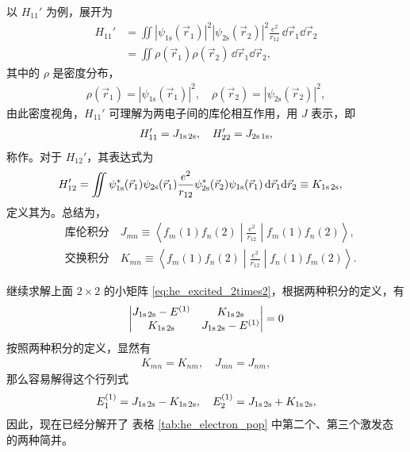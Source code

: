 以 $H_{11}'$ 为例，展开为
\begin{align}
    H_{11}' &= \iint |\psi_{\text{1s}}(\vec r_1)|^2 |\psi_{\text{2s}}(\vec r_2)|^2 \frac{e^2}{r_{12}} \,\dd\vec r_1 \dd\vec r_2 \\
    & = \iint \rho(\vec r_1) \rho(\vec r_2) \,\dd\vec r_1 \dd\vec r_2,
\end{align}
其中的 $\rho$ 是密度分布，
\begin{align}
    \rho(\vec r_1) = |\psi_{\text{1s}}(\vec r_1)|^2,
    \quad 
    \rho(\vec r_2) = |\psi_{\text{2s}}(\vec r_2)|^2,
\end{align}
由此密度视角，$H_{11}'$ 可理解为两电子间的库伦相互作用，用 $J$ 表示，即
\begin{align}
    H'_{11} = J_{\text{1s\,2s}}, \quad H_{22}' = J_{\text{2s\,1s}},
\end{align}
称作。对于 $H_{12}'$，其表达式为
\begin{align}
H_{12}' &= \iint \psi_{\text{1s}}^*(\vec r_1) \psi_{\text{2s}} (\vec r_1) \frac{e^2}{r_{12}} \psi_{\text{2s}}^*(\vec r_2) \psi_{\text{1s}} (\vec r_1) \,\mathrm{d}\vec r_1 \mathrm{d}\vec r_2 \equiv K_{\text{1s\,2s}},
\end{align}
定义其为。总结为，
\begin{align}
&\text{库伦积分}\quad 
J_{mn} \equiv \left\langle f_m(1) f_n(2) \middle| \frac{e^2}{r_{12}} \middle| f_m(1)f_n(2) \right\rangle, \\
&\text{交换积分}\quad K_{mn} \equiv \left\langle f_m(1) f_n(2) \middle| \frac{e^2}{r_{12}} \middle| f_n(1)f_m(2) \right\rangle. 
\end{align}

继续求解上面 $2\times2$ 的小矩阵 \eqref{eq:he_excited_2times2}，根据两种积分的定义，有
\begin{align}
    \left|\begin{matrix}
        J_{\text{1s\,2s}} - E^{(1)} & K_{\text{1s\,2s}} \\
        K_{\text{1s\,2s}} & J_{\text{1s\,2s}} - E^{(1)}
    \end{matrix}\right| = 0
\end{align}
按照两种积分的定义，显然有
\begin{align}
    K_{mn} = K_{nm}, \quad J_{mn} = J_{nm},
\end{align}
那么容易解得这个行列式
\begin{align}
E_1^{(1)} = J_{\text{1s\,2s}} - K_{\text{1s\,2s}}, \quad E_2^{(1)} = J_{\text{1s\,2s}} + K_{\text{1s\,2s}},
\end{align}
因此，现在已经分解开了
表格 \ref{tab:he_electron_pop} 中第二个、第三个激发态
的两种简并。

